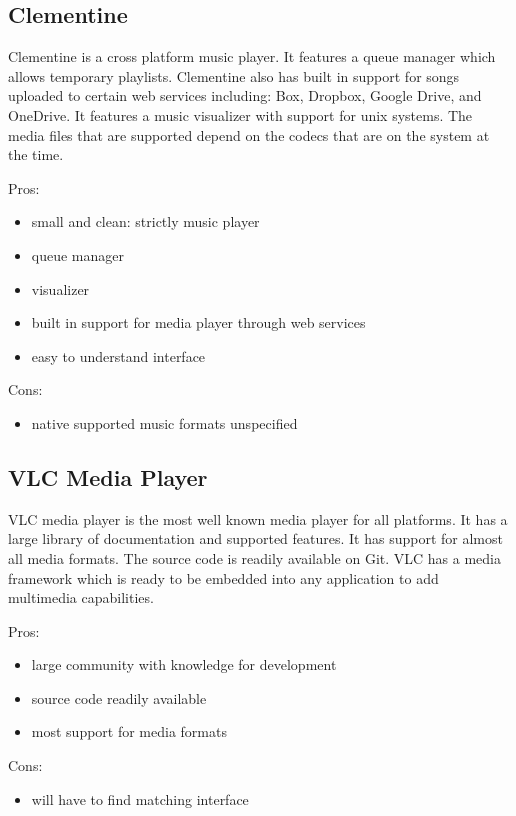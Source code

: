 \documentclass[onecolumn, draftclsnofoot,10pt, compsoc]{IEEEtran}
\begin{document}
\subsection{Clementine}
Clementine is a cross platform music player. It features a queue manager which allows temporary playlists. Clementine also has built in support for songs uploaded to certain web services including: Box, Dropbox, Google Drive, and OneDrive. It features a music visualizer with support for unix systems. The media files that are supported depend on the codecs that are on the system at the time. ~\cite{clementine}

Pros:
\begin{itemize}
    \item small and clean: strictly music player
    \item queue manager
    \item visualizer
    \item built in support for media player through web services
    \item easy to understand interface
\end{itemize}

Cons:
\begin{itemize}
    \item native supported music formats unspecified
\end{itemize}

\subsection{VLC Media Player}
VLC media player is the most well known media player for all platforms. It has a
large library of documentation and supported features. It has support for almost
all media formats. The source code is readily available on Git. VLC has a media
framework which is ready to be embedded into any application to add multimedia
capabilities. ~\cite{vlc:features}

Pros:
\begin{itemize}
    \item large community with knowledge for development
    \item source code readily available
    \item most support for media formats
\end{itemize}

Cons:
\begin{itemize}
    \item will have to find matching interface
\end{itemize}
\end{document}
